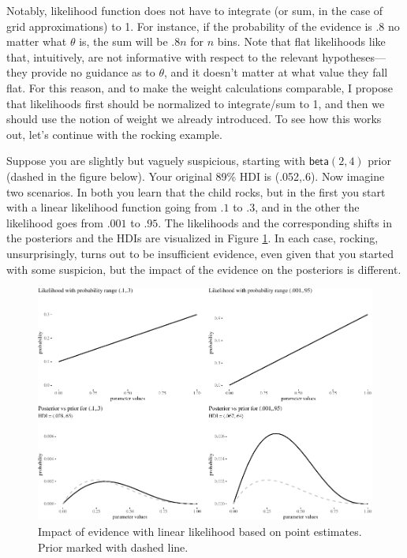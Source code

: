 \documentclass[
  10pt,
  dvipsnames,enabledeprecatedfontcommands]{scrartcl}
\begin{document}
Notably, likelihood function does not have to integrate (or sum, in the
case of grid approximations) to 1. For instance, if the probability of
the evidence is .8 no matter what \(\theta\) is, the sum will be \(.8n\)
for \(n\) bins. Note that flat likelihoods like that, intuitively, are
not informative with respect to the relevant hypotheses---they provide
no guidance as to \(\theta\), and it doesn't matter at what value they
fall flat. For this reason, and to make the weight calculations
comparable, I propose that likelihoods first should be normalized to
integrate/sum to 1, and then we should use the notion of weight we
already introduced. To see how this works out, let's continue with the
rocking example.

Suppose you are slightly but vaguely suspicious, starting with
\(\mathsf{beta}(2,4)\) prior (dashed in the figure below). Your original
89\% HDI is (.052,.6). Now imagine two scenarios. In both you learn that
the child rocks, but in the first you start with a linear likelihood
function going from \(.1\) to \(.3\), and in the other the likelihood
goes from \(.001\) to \(.95\). The likelihoods and the corresponding
shifts in the posteriors and the HDIs are visualized in Figure
\ref{fig:likelihood}. In each case, rocking, unsurprisingly, turns out
to be insufficient evidence, even given that you started with some
suspicion, but the impact of the evidence on the posteriors is
different.

\begin{figure}[H]

\begin{center}\includegraphics[width=1\linewidth]{imprecision_weight_files/figure-latex/fig:likelihood-1} \end{center}
\caption{Impact of evidence with linear likelihood based on point estimates. Prior marked with dashed line.}
\label{fig:likelihood}
\end{figure}
\end{document}
